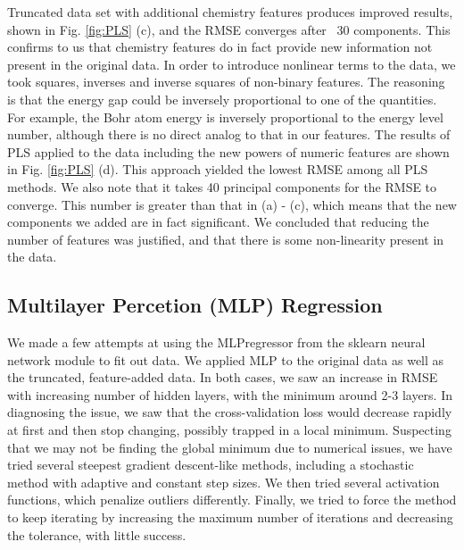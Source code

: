 \documentclass[11pt]{article}
\begin{document}
Truncated data set with additional chemistry features produces improved results, shown in Fig. \ref{fig:PLS} (c), and the RMSE converges after ~30 components. This confirms to us that chemistry features do in fact provide new information not present in the original data. In order to introduce nonlinear terms to the data, we took squares, inverses and inverse squares of non-binary features. The reasoning is that the energy gap could be inversely proportional to one of the quantities. For example, the Bohr atom energy is inversely proportional to the energy level number, although there is no direct analog to that in our features. The results of PLS applied to the data including the new powers of numeric features are shown in Fig. \ref{fig:PLS} (d). This approach yielded the lowest RMSE among all PLS methods. We also note that it takes 40 principal components for the RMSE to converge. This number is greater than that in (a) - (c), which means that the new components we added are in fact significant. We concluded that reducing the number of features was justified, and that there is some non-linearity present in the data.

\subsection{Multilayer Percetion (MLP) Regression}

We made a few attempts at using the MLPregressor from the sklearn neural network module to fit out data. We applied MLP to the original data as well as the truncated, feature-added data. In both cases, we saw an increase in RMSE with increasing number of hidden layers, with the minimum around 2-3 layers. In diagnosing the issue, we saw that the cross-validation loss would decrease rapidly at first and then stop changing, possibly trapped in a local minimum. Suspecting that we may not be finding the global minimum due to numerical issues, we have tried several steepest gradient descent-like methods, including a stochastic method with adaptive and constant step sizes. We then tried several activation functions, which penalize outliers differently. Finally, we tried to force the method to keep iterating by increasing the maximum number of iterations and decreasing the tolerance, with little success. 

\end{document}
